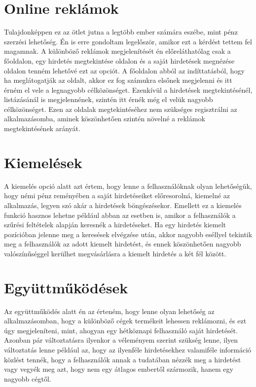 \documentclass[]{thesis-ekf}
\theoremstyle{definition}
\theoremstyle{remark}
\begin{document}
		 \section{Online reklámok}
		 	Tulajdonképpen ez az ötlet jutna a legtöbb ember számára eszébe, mint pénz szerzési lehetőség. Én is erre gondoltam legelőször, amikor ezt a kérdést tettem fel magamnak. A különböző reklámok megjelenítését én előreláthatólag csak a főoldalon, egy hirdetés megtekintése oldalon és a saját hirdetések megnézése oldalon tenném lehetővé ezt az opciót. A főoldalon abból az indíttatásból, hogy ha meglátogatják az oldalt, akkor ez fog számukra elsőnek megjelenni és itt érném el vele a legnagyobb célközönséget. Ezenkívül a hirdetések megtekintésénél, listázásánál is megjelennének, szintén itt érnék még el velük nagyobb célközönséget. Ezen az oldalak megtekintéséhez nem szükséges regisztrálni az alkalmazásomba, aminek köszönhetően szintén növelné a reklámok megtekintésének arányát.
		 \section{Kiemelések}
		 	A kiemelés opció alatt azt értem, hogy lenne a felhasználóknak olyan lehetőségük, hogy némi pénz reményében a saját hirdetéseiket előresorolná, kiemelné az alkalmazás, legyen szó akár a hirdetések böngészésekor. Emellett ez a kiemelés funkció hasznos lehetne például abban az esetben is, amikor a felhasználók a szűrési feltételek alapján keresnék a hirdetéseket. Ha egy hirdetés kiemelt pozícióban jelenne meg a keresések elvégzése után, akkor nagyobb eséllyel tekintik meg a felhasználók az adott kiemelt hirdetést, és ennek köszönhetően nagyobb valószínűséggel kerülhet megvásárlásra a kiemelt hirdetés a két fél között.
		 \section{Együttműködések}
			Az együttműködés alatt én az érteném, hogy lenne olyan lehetőség az alkalmazásomban, hogy a különböző cégek termékeit lehessen reklámozni, és ezt úgy megjeleníteni, mint, ahogyan egy hétköznapi felhasználó saját hirdetését. Azonban pár változtatásra ilyenkor a véleményem szerint szükség lenne, ilyen változtatás lenne például az, hogy az ilyenféle hirdetésekhez valamiféle információ közlést tennék, hogy a felhasználók annak a tudatában nézzék meg a hirdetést vagy vegyék meg azt, hogy nem egy átlagos embertől szármozik, hanem egy nagyobb cégtől.
\end{document}

